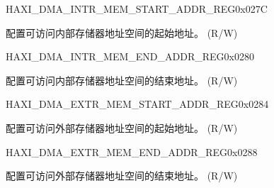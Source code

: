 \begin{register}{H}{AXI\_DMA\_INTR\_MEM\_START\_ADDR\_REG}{0x027C}\label{regdesc:AXIDMAINTRMEMSTARTADDRREG}
%
\regnewline%
\begin{regdesc}\begin{reglist}
\label{fielddesc:AXIDMAACCESSINTRMEMSTARTADDR}\item [AXI\_DMA\_ACCESS\_INTR\_MEM\_START\_ADDR] 配置可访问内部存储器地址空间的起始地址。 (R/W)
\end{reglist}\end{regdesc}
\end{register}


\begin{register}{H}{AXI\_DMA\_INTR\_MEM\_END\_ADDR\_REG}{0x0280}\label{regdesc:AXIDMAINTRMEMENDADDRREG}
%
\regnewline%
\begin{regdesc}\begin{reglist}
\label{fielddesc:AXIDMAACCESSINTRMEMENDADDR}\item [AXI\_DMA\_ACCESS\_INTR\_MEM\_END\_ADDR] 配置可访问内部存储器地址空间的结束地址。 (R/W)
\end{reglist}\end{regdesc}
\end{register}


\begin{register}{H}{AXI\_DMA\_EXTR\_MEM\_START\_ADDR\_REG}{0x0284}\label{regdesc:AXIDMAEXTRMEMSTARTADDRREG}
%
\regnewline%
\begin{regdesc}\begin{reglist}
\label{fielddesc:AXIDMAACCESSEXTRMEMSTARTADDR}\item [AXI\_DMA\_ACCESS\_EXTR\_MEM\_START\_ADDR] 配置可访问外部存储器地址空间的起始地址。 (R/W)
\end{reglist}\end{regdesc}
\end{register}


\begin{register}{H}{AXI\_DMA\_EXTR\_MEM\_END\_ADDR\_REG}{0x0288}\label{regdesc:AXIDMAEXTRMEMENDADDRREG}
%
\regnewline%
\begin{regdesc}\begin{reglist}
\label{fielddesc:AXIDMAACCESSEXTRMEMENDADDR}\item [AXI\_DMA\_ACCESS\_EXTR\_MEM\_END\_ADDR] 配置可访问外部存储器地址空间的结束地址。 (R/W)
\end{reglist}\end{regdesc}
\end{register}


